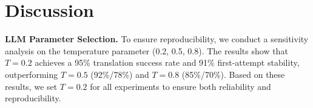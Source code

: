 \documentclass[conference]{IEEEtran}
\providecommand{\DIFdelend}{} %
\DeclareRobustCommand{\DIFdelend}{\DIFOaddend \let\includegraphics\DIFOincludegraphics} %
\begin{document}
\DIFdelend \section{Discussion}
\label{sec:discussion}

\textbf{LLM Parameter Selection. } \label{sec:llm-params}
To ensure reproducibility, we conduct a sensitivity analysis on the temperature parameter (0.2, 0.5, 0.8). 
The results show that $T=0.2$ achieves a 95\% translation success rate and 91\% first-attempt stability, outperforming $T=0.5$ (92\%/78\%) and $T=0.8$ (85\%/70\%). 
Based on these results, we set $T=0.2$ for all experiments to ensure both reliability and reproducibility.

\end{document}
